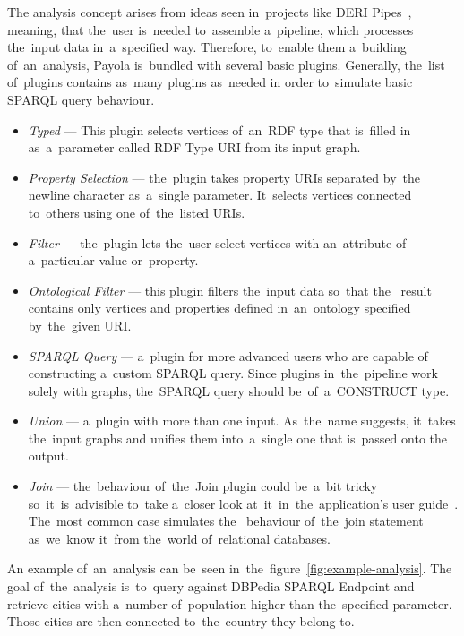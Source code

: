 The analysis concept arises from ideas seen in~projects like DERI 
Pipes~\cite{deri-pipes}, meaning, that the~user is~needed to~assemble a~pipeline,
which processes the~input data in~a~specified way. Therefore, to~enable them a~building of~an~analysis, Payola is~bundled with several basic 
plugins. Generally, the~list of~plugins contains as~many plugins as~needed
in order to~simulate basic SPARQL query behaviour.

\begin{itemize}
  \item \emph{Typed} --- This plugin selects vertices of~an~RDF type that is~filled in
  as~a~parameter called RDF Type URI from its input graph.
  
  \item \emph{Property Selection} --- the~plugin takes property URIs separated by~the
  newline character as~a~single parameter. It~selects vertices connected
  to~others using one of~the~listed URIs.
  
  \item \emph{Filter} --- the~plugin lets the~user select vertices with an~attribute of
  a~particular value or~property.
 
  \item \emph{Ontological Filter} --- this plugin filters the~input data so~that the~  result contains only vertices and properties defined in~an~ontology specified 
  by~the~given URI.
  
  \item \emph{SPARQL Query} --- a~plugin for more advanced users who are capable of~  constructing a~custom SPARQL query. Since plugins in~the~pipeline work solely with 
  graphs, the~SPARQL query should be~of~a~CONSTRUCT type.
  
  \item \emph{Union} --- a~plugin with more than one input. As~the~name suggests, it~takes 
  the~input graphs and unifies them into~a~single one that is~passed onto the~  output.
  
  \item \emph{Join} --- the~behaviour of~the~Join plugin could be~a~bit tricky so~it~is~advisible
  to~take a~closer look at~it~in~the~application's 
  user guide~\cite{payola:ug:join-plugin}. The~most common case simulates the~  behaviour of~the~join statement as~we~know it~from the~world of~relational 
  databases.
  
\end{itemize}

An example of~an~analysis can be~seen in~the~figure~\ref{fig:example-analysis}.
The goal of~the~analysis is~to~query against DBPedia SPARQL Endpoint and 
retrieve cities with a~number of~population higher than the~specified parameter. 
Those cities are then connected to~the~country they belong to.

